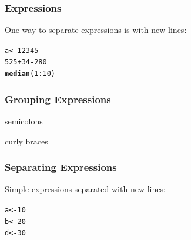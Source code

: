 \documentclass[12pt]{beamer}\usepackage[]{graphicx}\usepackage[]{color}
\makeatletter
\newcommand{\hlnum}[1]{\textcolor[rgb]{0.686,0.059,0.569}{#1}}%
\newcommand{\hlopt}[1]{\textcolor[rgb]{0,0,0}{#1}}%
\newcommand{\hlstd}[1]{\textcolor[rgb]{0.345,0.345,0.345}{#1}}%
\newcommand{\hlkwb}[1]{\textcolor[rgb]{0.69,0.353,0.396}{#1}}%
\newcommand{\hlkwd}[1]{\textcolor[rgb]{0.737,0.353,0.396}{\textbf{#1}}}%
\newenvironment{kframe}{%
 \def\at@end@of@kframe{}%
 \ifinner\ifhmode%
  \def\at@end@of@kframe{\end{minipage}}%
  \begin{minipage}{\columnwidth}%
 \fi\fi%
 \def\FrameCommand##1{\hskip\@totalleftmargin \hskip-\fboxsep
 \colorbox{shadecolor}{##1}\hskip-\fboxsep
     \hskip-\linewidth \hskip-\@totalleftmargin \hskip\columnwidth}%
 \MakeFramed {\advance\hsize-\width
   \@totalleftmargin\z@ \linewidth\hsize
   \@setminipage}}%
 {\par\unskip\endMakeFramed%
 \at@end@of@kframe}
\newenvironment{knitrout}{}{} %
\makeatother
\begin{document}

\begin{frame}[fragile]
\frametitle{Expressions}

One way to separate expressions is with new lines:
\begin{knitrout}\footnotesize
{}\color{fgcolor}\begin{kframe}
\begin{alltt}
\hlstd{a} \hlkwb{<-} \hlnum{12345}
\hlnum{525} \hlopt{+} \hlnum{34} \hlopt{-} \hlnum{280}
\hlkwd{median}\hlstd{(}\hlnum{1}\hlopt{:}\hlnum{10}\hlstd{)}
\end{alltt}
\end{kframe}
\end{knitrout}

\end{frame}


\begin{frame}[fragile]
\frametitle{Grouping Expressions}

\bbi
  \item semicolons
  \item curly braces
\ei
\eb

\end{frame}


\begin{frame}[fragile]
\frametitle{Separating Expressions}

Simple expressions separated with new lines:
\begin{knitrout}\footnotesize
{}\color{fgcolor}\begin{kframe}
\begin{alltt}
\hlstd{a} \hlkwb{<-} \hlnum{10}
\hlstd{b} \hlkwb{<-} \hlnum{20}
\hlstd{d} \hlkwb{<-} \hlnum{30}
\end{alltt}
\end{kframe}
\end{knitrout}

\end{frame}

\end{document}
